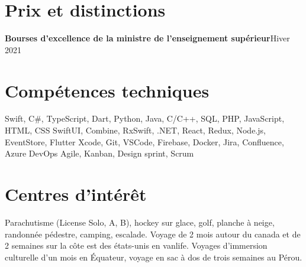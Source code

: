 \documentclass[letterpaper,11pt]{article}
\begin{document}
\resumeSubHeadingListEnd

\vspace{1pt}
\section{Prix et distinctions}
\resumeSubHeadingListStart

\resumeProjectHeading
{\textbf{{Bourses d’excellence de la ministre de l’enseignement sup\'erieur}}}{Hiver 2021}
\resumeItemListStart
{}
\resumeItemListEnd

\resumeSubHeadingListEnd

\vspace{1pt}
\section{Comp\'etences techniques}
\resumeSubHeadingListStart

{Swift, C\#, TypeScript, Dart, Python, Java, C/C++, SQL, PHP, JavaScript, HTML, CSS}
{SwiftUI, Combine, RxSwift, .NET, React, Redux, Node.js, EventStore, Flutter}
{Xcode, Git, VSCode, Firebase, Docker, Jira, Confluence, Azure DevOps} 
{Agile, Kanban, Design sprint, Scrum}
\resumeSubHeadingListEnd


\vspace{1pt}
\section{Centres d'int\'er\^et}
\resumeSubHeadingListStart
{}
{Parachutisme (License Solo, A, B), hockey sur glace, golf, planche \`a neige, randonn\'ee p\'edestre, camping, escalade.}
{Voyage de 2 mois autour du canada et de 2 semaines sur la c\^{o}te est des \'etats-unis en vanlife. Voyages d'immersion culturelle d'un mois en \'Equateur, voyage en sac \`a dos de trois semaines au P\'erou.}
\resumeSubHeadingListEnd
\end{document}
